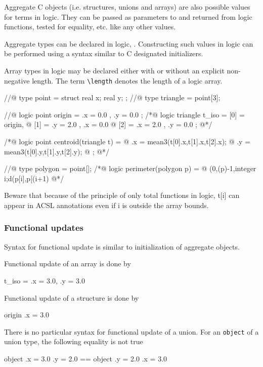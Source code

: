 Aggregate C objects (i.e. structures, unions and arrays) are also
possible values for terms in logic.
They can be passed as parameters to and
 returned from logic functions, tested for equality, etc. like any
other values.

Aggregate types can be declared in logic,
. Constructing such values in logic can be
performed using a syntax similar to C designated initializers.

\begin{example}
Array types in logic may be declared either with or without an
explicit non-negative length. The term \lstinline|\length|
denotes the length of a logic array.

\begin{listing-nonumber}
//@ type point = struct { real x; real y; };
//@ type triangle = point[3];

//@ logic point origin = { .x = 0.0 , .y = 0.0 };
/*@ logic triangle t_iso = { [0] = origin,
  @                          [1] = { .y = 2.0 , .x = 0.0 }
  @                          [2] = { .x = 2.0 , .y = 0.0 }};
  @*/

/*@ logic point centroid(triangle t) = {
  @    .x = mean3(t[0].x,t[1].x,t[2].x);
  @    .y = mean3(t[0].y,t[1].y,t[2].y);
  @ };
  @*/

//@ type polygon = point[];
/*@ logic perimeter(polygon p) =
  @   \sum(0,\length(p)-1,\lambda integer i;d(p[i],p[(i+1) %
  @*/
\end{listing-nonumber}
Beware that because of the principle of only total functions in logic,
t[i] can appear in ACSL annotations even if i is outside the array bounds.

\end{example}

\subsubsection{Functional updates}

Syntax for functional update is similar to initialization of aggregate objects.
\begin{example}
Functional update of an array is done by
\begin{listing-nonumber}
{ t_iso \with [0] = { .x = 3.0, .y = 3.0 } }
\end{listing-nonumber}

Functional update of a structure is done by
\begin{listing-nonumber}
{ origin \with .x = 3.0 }
\end{listing-nonumber}

There is no particular syntax for functional update of a union.
For an \lstinline|object| of a union type, the following equality is not true
\begin{listing-nonumber}
{ { object \with .x = 3.0 }
           \with .y = 2.0 } == { { object \with .y = 2.0 }
                                          \with .x = 3.0 }
\end{listing-nonumber}

\end{example}

